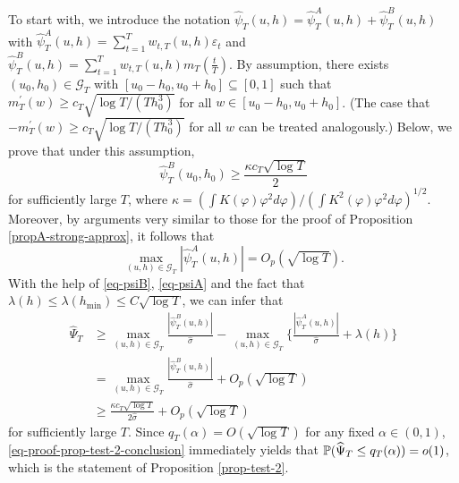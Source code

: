 To start with, we introduce the notation $\widehat{\psi}_T(u,h) = \widehat{\psi}_T^A(u,h) + \widehat{\psi}_T^B(u,h)$ with $\widehat{\psi}_T^A(u,h) = \sum\nolimits_{t=1}^T w_{t,T}(u,h) \varepsilon_t$ and $\widehat{\psi}_T^B(u,h) = \sum\nolimits_{t=1}^T w_{t,T}(u,h) m_T(\frac{t}{T})$. By assumption, there exists $(u_0,h_0) \in \mathcal{G}_T$ with $[u_0-h_0,u_0+h_0] \subseteq [0,1]$ such that $m_T^\prime(w) \ge c_T \sqrt{\log T/(Th_0^3)}$ for all $w \in [u_0-h_0,u_0+h_0]$. (The case that $-m_T^\prime(w) \ge c_T \sqrt{\log T/(Th_0^3)}$ for all $w$ can be treated analogously.) Below, we prove that under this assumption, 
\begin{equation}\label{eq-psiB}
\widehat{\psi}_T^B(u_0,h_0) \ge \frac{\kappa c_T \sqrt{\log T}}{2} 
\end{equation}
for sufficiently large $T$, where $\kappa = (\int K(\varphi) \varphi^2 d\varphi) / (\int K^2(\varphi) \varphi^2 d\varphi)^{1/2}$. Moreover, by arguments very similar to those for the proof of Proposition \ref{propA-strong-approx}, it follows that
\begin{equation}\label{eq-psiA}
\max_{(u,h) \in \mathcal{G}_T} |\widehat{\psi}_T^A(u,h)| = O_p(\sqrt{\log T}). 
\end{equation}
With the help of \eqref{eq-psiB}, \eqref{eq-psiA} and the fact that $\lambda(h) \le \lambda(h_{\min}) \le C \sqrt{\log T}$, we can infer that
\begin{align}
\widehat{\Psi}_T 
 & \ge \max_{(u,h) \in \mathcal{G}_T} \frac{|\widehat{\psi}_T^B(u,h)|}{\widehat{\sigma}} - \max_{(u,h) \in \mathcal{G}_T} \Big\{ \frac{|\widehat{\psi}_T^A(u,h)|}{\widehat{\sigma}} + \lambda(h) \Big\} \nonumber \\
 & = \max_{(u,h) \in \mathcal{G}_T} \frac{|\widehat{\psi}_T^B(u,h)|}{\widehat{\sigma}} + O_p(\sqrt{\log T}) \nonumber \\
 & \ge \frac{\kappa c_T \sqrt{\log T}}{2 \widehat{\sigma}} + O_p(\sqrt{\log T}) \label{eq-proof-prop-test-2-conclusion}
\end{align}  
for sufficiently large $T$. Since $q_T(\alpha) = O(\sqrt{\log T})$ for any fixed $\alpha \in (0,1)$, \eqref{eq-proof-prop-test-2-conclusion} immediately yields that $\mathbb{P}(\widehat{\Psi}_T \le q_T(\alpha)) = o(1)$, which is the statement of Proposition \ref{prop-test-2}. 



